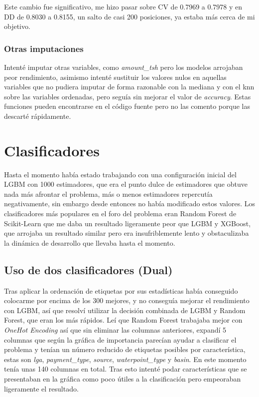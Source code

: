 \documentclass{article}
\begin{document}
Este cambio fue significativo, me hizo pasar sobre CV de 0.7969 a 0.7978 y en DD de 0.8030 a 0.8155, un salto de casi 200 posiciones, ya estaba más cerca de mi objetivo.

\subsubsection{Otras imputaciones}

Intenté imputar otras variables, como \textit{amount\_tsh} pero los modelos arrojaban peor rendimiento, asimismo intenté sustituir los valores nulos en aquellas variables que no pudiera imputar de forma razonable con la mediana y con el knn sobre las variables ordenadas, pero seguía sin mejorar el valor de \textit{accuracy}. Estas funciones pueden encontrarse en el código fuente pero no las comento porque las descarté rápidamente.

\section{Clasificadores}

Hasta el momento había estado trabajando con una configuración inicial del LGBM con 1000 estimadores, que era el punto dulce de estimadores que obtuve nada más afrontar el problema, más o menos estimadores repercutía negativamente, sin embargo desde entonces no había modificado estos valores. Los clasificadores más populares en el foro del problema eran Random Forest de Scikit-Learn que me daba un resultado ligeramente peor que LGBM y XGBoost, que arrojaba un resultado similar pero era insufriblemente lento y obstaculizaba la dinámica de desarrollo que llevaba hasta el momento.

\subsection{Uso de dos clasificadores (Dual)}

Tras aplicar la ordenación de etiquetas por sus estadísticas había conseguido colocarme por encima de los 300 mejores, y no conseguía mejorar el rendimiento con LGBM, así que resolví utilizar la decisión combinada de LGBM y Random Forest, que eran los más rápidos. Leí que Random Forest trabajaba mejor con \textit{OneHot Encoding} así que sin eliminar las columnas anteriores, expandí 5 columnas que según la gráfica de importancia parecían ayudar a clasificar el problema y tenían un número reducido de etiquetas posibles por característica, estas son \textit{lga}, \textit{payment\_type}, \textit{source}, \textit{waterpoint\_type} y \textit{basin}. En este momento tenía unas 140 columnas en total. Tras esto intenté podar características que se presentaban en la gráfica como poco útiles a la clasificación pero empeoraban ligeramente el resultado.
\end{document}
